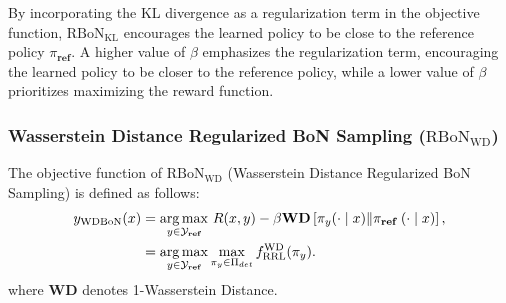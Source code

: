By incorporating the KL divergence as a regularization term in the objective function, $\mathrm{RBoN}_{\mathrm{KL}}$ encourages the learned policy to be close to the reference policy $\pi_{\textbf{ref}}$. A higher value of $\beta$ emphasizes the regularization term, encouraging the learned policy to be closer to the reference policy, while a lower value of $\beta$ prioritizes maximizing the reward function.


\subsubsection{Wasserstein Distance Regularized BoN Sampling ($\mathrm{RBoN}_{\mathrm{WD}}$)}\label{WD}

The objective function of $\mathrm{RBoN}_{\mathrm{WD}}$ (Wasserstein Distance Regularized BoN Sampling) is defined as follows:
\begin{equation*}
\begin{aligned}
y_{\mathrm{WDBoN}}(x) &= \operatorname*{arg\,max}_{y \in \mathcal{Y_{\textbf{ref}}}} \,R(x, y)-\beta \textbf{WD}\left[\pi_y(\cdot \mid x) \| \pi_{\textbf{ref }}(\cdot \mid x)\right],\\
&= \underset{y \in \mathcal{Y}_{\textbf{ref}}}{\operatorname*{arg\,max}}\max_{\pi_y \in \Pi_{det}} f_\mathrm{RRL}^{\mathrm{WD}}(\pi_y).
\end{aligned}
\end{equation*}
where $\textbf{WD}$ denotes 1-Wasserstein Distance.


